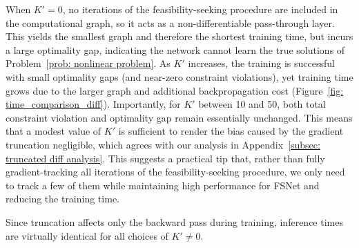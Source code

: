 \documentclass{article}
\begin{document}
When $K'=0$, no iterations of the feasibility-seeking procedure are included in the computational graph, so it acts as a non-differentiable pass-through layer. 
This yields the smallest graph and therefore the shortest training time, but incurs a large optimality gap, indicating the network cannot learn the true solutions of Problem~\eqref{prob: nonlinear problem}. 
As $K'$ increases, the training is successful with small optimality gaps (and near-zero constraint violations), yet training time grows due to the larger graph and additional backpropagation cost (Figure~\ref{fig: time_comparison_diff}).
Importantly, for $K'$ between 10 and 50, both total constraint violation and optimality gap remain essentially unchanged. 
This means that a modest value of $K'$ is sufficient to render the bias caused by the gradient truncation negligible, which agrees with our analysis in Appendix~\ref{subsec: truncated diff analysis}. 
This suggests a practical tip that, rather than fully gradient-tracking all iterations of the feasibility-seeking procedure, we only need to track a few of them while maintaining high performance for FSNet and reducing the training time. 

Since truncation affects only the backward pass during training, inference times are virtually identical for all choices of $K' \neq 0$.
\end{document}
